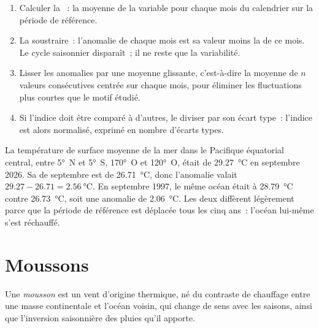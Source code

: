 \begin{method}\label{met:b2:climate-variability:index}
\begin{enumerate}
\item Calculer la ~: la moyenne de la variable pour chaque mois du calendrier sur la
période de référence.
\item La soustraire~: l'anomalie de chaque mois est sa valeur moins la  de ce mois.
Le cycle saisonnier disparaît~; il ne reste que la variabilité.
\item Lisser les anomalies par une moyenne glissante, c'est-à-dire la moyenne de $n$ valeurs consécutives centrée sur
chaque mois, pour éliminer les fluctuations plus courtes que le motif étudié.
\item Si l'indice doit être comparé à d'autres, le diviser par son écart type~: l'indice est alors
normalisé, exprimé en nombre d'écarts types.
\end{enumerate}
\end{method}

\begin{example}\label{ex:b2:climate-variability:anomaly}
La température de surface moyenne de la mer dans le Pacifique équatorial central, entre \ang{5}~N et
\ang{5}~S, \ang{170}~O et \ang{120}~O, était de \qty{29.27}{\celsius} en septembre 2026. Sa  de septembre
est de \qty{26.71}{\celsius}, donc l'anomalie valait $29.27 - 26.71 = \qty{2.56}{\celsius}$.
En septembre 1997, le même océan était à \qty{28.79}{\celsius} contre \qty{26.73}{\celsius}, soit une
anomalie de \qty{2.06}{\celsius}. Les deux  diffèrent légèrement parce que la période de
référence est déplacée tous les cinq ans~: l'océan lui-même s'est réchauffé.
\end{example}

\section{Moussons}\label{sec:b2:climate-variability:monsoons}

\begin{definition}[Mousson]\label{def:b2:climate-variability:monsoon}
Une \emph{mousson} est un vent d'origine thermique, né du contraste de chauffage entre une masse
continentale et l'océan voisin, qui change de sens avec les saisons, ainsi que
l'inversion saisonnière des pluies qu'il apporte.
\end{definition}


